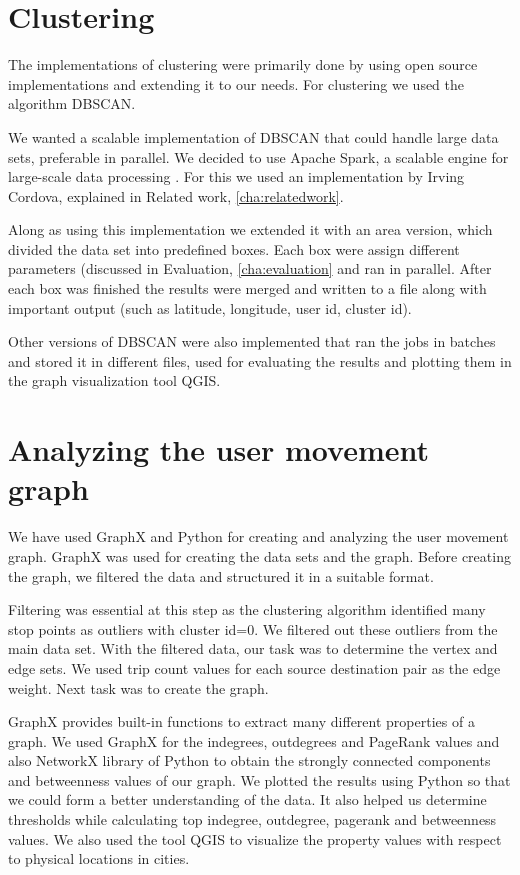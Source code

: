 \section{Clustering}

 The implementations of clustering were primarily done by using open source implementations and extending it to our needs. For clustering we used the algorithm DBSCAN. 
 
We wanted a scalable implementation of DBSCAN that could handle large data sets, preferable in parallel. We decided to use Apache Spark, a scalable engine for large-scale data processing \cite{spark}. For this we used an implementation by Irving Cordova, explained in Related work, \ref{cha:relatedwork}. 

Along as using this implementation we extended it with an area version, which divided the data set into predefined boxes. Each box were assign different parameters (discussed in Evaluation, \ref{cha:evaluation} and ran in parallel. After each box was finished the results were merged and written to a file along with important output (such as latitude, longitude, user id, cluster id).

Other versions of DBSCAN were also implemented that ran the jobs in batches and stored it in different files, used for evaluating the results and plotting them in the graph visualization tool QGIS.


\section{Analyzing the user movement graph}
We have used GraphX and Python for creating and analyzing the user movement graph. GraphX was used for creating the data sets and the graph. Before creating the graph, we filtered the data and structured it in a suitable format. 

Filtering was essential at this step as the clustering algorithm identified many stop points as outliers with cluster id=0. We filtered out these outliers from the main data set. With the filtered data, our task was to determine the vertex and edge sets. We used trip count values for each source destination pair as the edge weight. Next task was to create the graph.
 
GraphX provides built-in functions to extract many different properties of a graph. We used GraphX for the indegrees, outdegrees and PageRank values and also NetworkX library of Python to obtain the strongly connected components and betweenness values of our graph. We plotted the results using Python so that we could form a better understanding of the data. It also helped us determine thresholds while calculating top indegree, outdegree, pagerank and betweenness values. We also used the tool QGIS to visualize the property values with respect to physical locations in cities.


